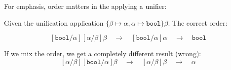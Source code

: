 \noindent
For emphasis, order matters in the applying a unifier:
\begin{Example}

    \noindent
    Given the unification application $\{\beta\mapsto\alpha,\alpha\mapsto\texttt{bool}\}\beta$. The correct order:

    $$
        [\texttt{bool}/\alpha][\alpha/\beta]\beta\quad\to\quad[\texttt{bool}/\alpha]\alpha\quad\to\quad\texttt{bool}
    $$

    \noindent
    If we mix the order, we get a completely different result (wrong):
    $$
        [\alpha/\beta][\texttt{bool}/\alpha]\beta\quad\to\quad [\alpha/\beta]\beta\quad\to\quad\alpha
    $$
\end{Example}

\newpage 

